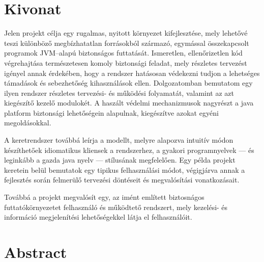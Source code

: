 
%

\begin{otherlanguage}{hungarian}
\chapter*{Kivonat}

Jelen projekt célja egy rugalmas, nyitott környezet kifejlesztése, mely lehetővé teszi különböző megbízhatatlan forrásokból származó, egymással összekapcsolt programok JVM--alapú biztonságos futtatását. Ismeretlen, ellenőrizetlen kód végrehajtása természetesen komoly biztonsági feladat, mely részletes tervezést igényel annak érdekében, hogy a rendszer hatásosan védekezni tudjon a lehetséges támadások és sebezhetőség kihasználások ellen. Dolgozatomban bemutatom egy ilyen rendszer részletes tervezési- és működési folyamatát, valamint az azt kiegészítő kezelő modulokét. A haszált védelmi mechanizmusok nagyrészt a java platform biztonsági lehetőségein alapulnak, kiegészítve azokat egyéni megoldásokkal.

A keretrendszer továbbá leírja a modellt, melyre alapozva intuitív módon készíthetőek idiomatikus kliensek a rendszerhez, a gyakori programnyelvek --- és leginkább a gazda java nyelv --- stílusának megfelelően. Egy példa projekt keretein belül bemutatok egy tipikus felhasználási módot, végigjárva annak a fejlesztés során felmerülő tervezési döntéseit és megvalósítási vonatkozásait. 

Továbbá a projekt megvalósít egy, az imént említett biztosnágos futtatókörnyezetet felhasználó és működtető rendszert, mely kezelési- és információ megjelenítési lehetőségekkel látja el felhasználóit. 

\end{otherlanguage}

\chapter*{Abstract}

